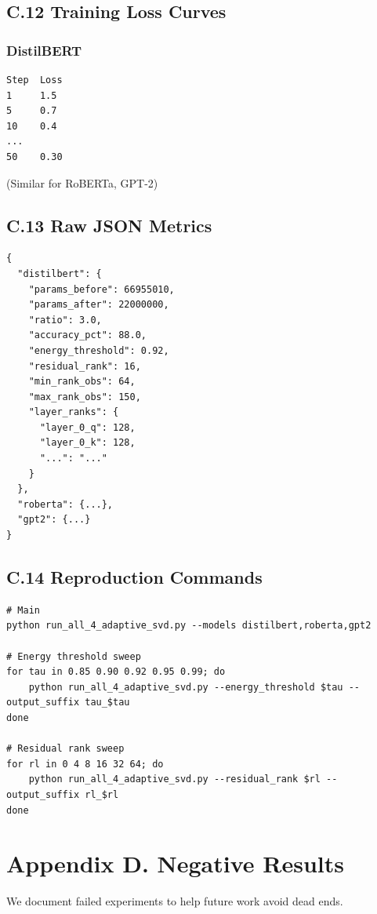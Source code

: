 \subsection{C.12 Training Loss Curves}

\subsubsection{DistilBERT}
\begin{lstlisting}
Step  Loss
1     1.5
5     0.7
10    0.4
...
50    0.30
\end{lstlisting}

(Similar for RoBERTa, GPT-2)

\subsection{C.13 Raw JSON Metrics}

\begin{lstlisting}
{
  "distilbert": {
    "params_before": 66955010,
    "params_after": 22000000,
    "ratio": 3.0,
    "accuracy_pct": 88.0,
    "energy_threshold": 0.92,
    "residual_rank": 16,
    "min_rank_obs": 64,
    "max_rank_obs": 150,
    "layer_ranks": {
      "layer_0_q": 128,
      "layer_0_k": 128,
      "...": "..."
    }
  },
  "roberta": {...},
  "gpt2": {...}
}
\end{lstlisting}

\subsection{C.14 Reproduction Commands}

\begin{lstlisting}
# Main
python run_all_4_adaptive_svd.py --models distilbert,roberta,gpt2

# Energy threshold sweep
for tau in 0.85 0.90 0.92 0.95 0.99; do
    python run_all_4_adaptive_svd.py --energy_threshold $tau --output_suffix tau_$tau
done

# Residual rank sweep
for rl in 0 4 8 16 32 64; do
    python run_all_4_adaptive_svd.py --residual_rank $rl --output_suffix rl_$rl
done
\end{lstlisting}


\section{Appendix D. Negative Results}

We document failed experiments to help future work avoid dead ends.


